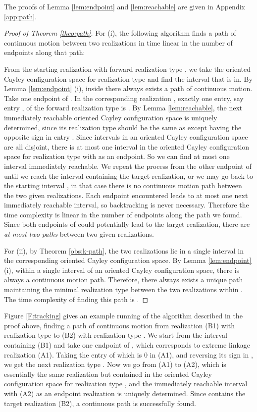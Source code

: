 \documentclass[secthm,amsthm,english]{article}
\theoremstyle{definition}
\theoremstyle{remark}
\begin{document}
The proofs of Lemma \ref{lem:endpoint} and \ref{lem:reachable} are given in Appendix \ref{app:path}.




\begin{proof}[Proof of Theorem \ref{theo:path}]
For (i), the following algorithm finds a path of continuous motion between two realizations in time linear in the number of endpoints along that path: 

From the starting realization  with forward realization type , 
we take the oriented Cayley configuration space for realization type  and find the interval  that  is in. 
By Lemma \ref{lem:endpoint} (i), inside  there always exists a path of continuous motion. 
Take one endpoint  of . 
In the corresponding realization , exactly one entry, say entry , of the forward realization type is . 
By Lemma \ref{lem:reachable}, 
the next immediately reachable oriented Cayley configuration space 
is uniquely determined, 
since its realization type  should be the same as  except having the opposite sign in entry .
Since intervals in an oriented Cayley configuration space are all disjoint, 
there is at most one interval in the oriented Cayley configuration space for realization type  with  as an endpoint. So 
we can find at most one interval  immediately reachable. 
We repeat the process from the other endpoint of  until we reach the interval containing the target realization, or we may go back to the starting interval , 
in that case there is no continuous motion path between the two given realizations. 
Each endpoint encountered leads to at most one next immediately reachable interval, so backtracking is never necessary.
Therefore the time complexity is linear in the number of endpoints along the path we found.
Since both endpoints of  could potentially lead to the target realization, 
there are \emph{at most two paths} between two given realizations. 


For (ii), by Theorem \ref{obs:k-path}, the two realizations lie in a single interval  in the corresponding oriented Cayley configuration space. 
By Lemma \ref{lem:endpoint} (i),
within a single interval of an oriented Cayley configuration space, there is always a continuous motion path.  
Therefore, there always exists a unique path maintaining the minimal realization type between the two realizations within . 
The time complexity of finding this path is . 
\end{proof}


Figure \ref{F:tracking} gives an example running 
of the algorithm described in the proof above, 
finding a path of continuous motion 
from realization (B1) with realization type  to (B2) with realization type . 
We start from the interval  containing (B1) and take one endpoint of , which corresponds to extreme linkage realization (A1).  
Taking the entry of  which is 0 in (A1), and reversing its sign in , 
we get the next realization type . 
Now we go from (A1) to (A2), 
which is essentially the same realization but contained in the oriented Cayley configuration space for realization type , 
and the immediately reachable interval  with (A2) as an endpoint realization is uniquely determined. 
Since  contains the target realization (B2), a continuous path is successfully found. 
\end{document}
